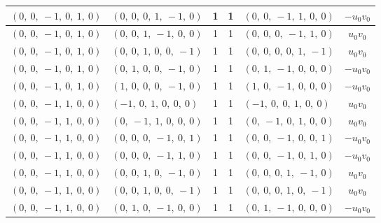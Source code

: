 \documentclass[11pt]{article}
\theoremstyle{definition}
\begin{document}
\begin{longtable}{|l|l|c|c|l|c|}
    \hline
    $\left( 0, \  0, \  -1, \  0, \  1, \  0\right)$ & $\left( 0, \  0, \  0, \  1, \  -1, \  0\right)$ & 1 & 1 & $\left( 0, \  0, \  -1, \  1, \  0, \  0\right)$ & $- u_{0} v_{0}$ \\
    \hline
    $\left( 0, \  0, \  -1, \  0, \  1, \  0\right)$ & $\left( 0, \  0, \  1, \  -1, \  0, \  0\right)$ & 1 & 1 & $\left( 0, \  0, \  0, \  -1, \  1, \  0\right)$ & $u_{0} v_{0}$ \\
    \hline
    $\left( 0, \  0, \  -1, \  0, \  1, \  0\right)$ & $\left( 0, \  0, \  1, \  0, \  0, \  -1\right)$ & 1 & 1 & $\left( 0, \  0, \  0, \  0, \  1, \  -1\right)$ & $u_{0} v_{0}$ \\
    \hline
    $\left( 0, \  0, \  -1, \  0, \  1, \  0\right)$ & $\left( 0, \  1, \  0, \  0, \  -1, \  0\right)$ & 1 & 1 & $\left( 0, \  1, \  -1, \  0, \  0, \  0\right)$ & $- u_{0} v_{0}$ \\
    \hline
    $\left( 0, \  0, \  -1, \  0, \  1, \  0\right)$ & $\left( 1, \  0, \  0, \  0, \  -1, \  0\right)$ & 1 & 1 & $\left( 1, \  0, \  -1, \  0, \  0, \  0\right)$ & $- u_{0} v_{0}$ \\
    \hline
    $\left( 0, \  0, \  -1, \  1, \  0, \  0\right)$ & $\left( -1, \  0, \  1, \  0, \  0, \  0\right)$ & 1 & 1 & $\left( -1, \  0, \  0, \  1, \  0, \  0\right)$ & $u_{0} v_{0}$ \\
    \hline
    $\left( 0, \  0, \  -1, \  1, \  0, \  0\right)$ & $\left( 0, \  -1, \  1, \  0, \  0, \  0\right)$ & 1 & 1 & $\left( 0, \  -1, \  0, \  1, \  0, \  0\right)$ & $u_{0} v_{0}$ \\
    \hline
    $\left( 0, \  0, \  -1, \  1, \  0, \  0\right)$ & $\left( 0, \  0, \  0, \  -1, \  0, \  1\right)$ & 1 & 1 & $\left( 0, \  0, \  -1, \  0, \  0, \  1\right)$ & $- u_{0} v_{0}$ \\
    \hline
    $\left( 0, \  0, \  -1, \  1, \  0, \  0\right)$ & $\left( 0, \  0, \  0, \  -1, \  1, \  0\right)$ & 1 & 1 & $\left( 0, \  0, \  -1, \  0, \  1, \  0\right)$ & $- u_{0} v_{0}$ \\
    \hline
    $\left( 0, \  0, \  -1, \  1, \  0, \  0\right)$ & $\left( 0, \  0, \  1, \  0, \  -1, \  0\right)$ & 1 & 1 & $\left( 0, \  0, \  0, \  1, \  -1, \  0\right)$ & $u_{0} v_{0}$ \\
    \hline
    $\left( 0, \  0, \  -1, \  1, \  0, \  0\right)$ & $\left( 0, \  0, \  1, \  0, \  0, \  -1\right)$ & 1 & 1 & $\left( 0, \  0, \  0, \  1, \  0, \  -1\right)$ & $u_{0} v_{0}$ \\
    \hline
    $\left( 0, \  0, \  -1, \  1, \  0, \  0\right)$ & $\left( 0, \  1, \  0, \  -1, \  0, \  0\right)$ & 1 & 1 & $\left( 0, \  1, \  -1, \  0, \  0, \  0\right)$ & $- u_{0} v_{0}$ \\

\end{longtable}
\end{document}
